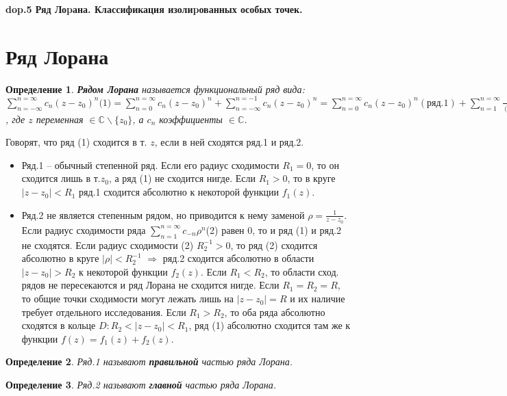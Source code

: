 \documentclass{article}
\newtheorem{definition}{Определение}
\begin{document}
\textbf{\LARGE dop.5 Ряд Лоpана. Классификация изолиpованных особых точек.}
\section{Ряд Лорана}
\begin{definition}
\textbf{Рядом Лорана} называется функциональный ряд вида: $\sum_{n=-\infty}^{n=\infty}c_n(z-z_0)^n\text{(1)}=\sum_{n=0}^{n=\infty}c_n(z-z_0)^n + \sum_{n=-\infty}^{n=-1}c_{n}(z-z_0)^n = \sum_{n=0}^{n=\infty}c_n(z-z_0)^n(\text{ряд.1}) +  \sum_{n=1}^{n=\infty}\frac{c_{-n}}{(z-z_0)^n}(\text{ряд.2})$, где $z$ переменная $\in \mathbb{C}\backslash\{z_0\}$, а $c_n$ коэффициенты $\in \mathbb{C}$.
\end{definition}

\noindent Говорят, что ряд (1) сходится в т. $z$, если в ней сходятся ряд.1 и ряд.2.

\begin{itemize}
    \item Ряд.1 -- обычный степенной ряд. Если его радиус сходимости $R_1=0$, то он сходится лишь в т.$z_0$, а ряд (1) не сходится нигде. Если $R_1>0$, то в круге $|z-z_0|<R_1$ ряд.1 сходится абсолютно к некоторой функции $f_1(z)$.
    
    \item Ряд.2 не является степенным рядом, но приводится к нему заменой $\rho = \frac{1}{z-z_0}$. Если радиус сходимости ряда $\sum_{n=1}^{n=\infty}c_{-n}\rho^n$(2) равен 0, то и ряд (1) и ряд.2 не сходятся. Если радиус сходимости (2) $R^{-1}_2 > 0$, то ряд (2) сходится абсолютно в круге $|\rho|<R^{-1}_2$ $\Rightarrow$ ряд.2 сходится абсолютно в области $|z-z_0|>R_2$  к некоторой функции $f_2(z)$. Если $R_1<R_2$, то области сход. рядов не пересекаются и ряд Лорана не сходится нигде. Если $R_1=R_2=R$, то общие точки сходимости могут лежать лишь на $|z-z_0|=R$ и их наличие требует отдельного исследования. Если $R_1>R_2$, то оба ряда абсолютно сходятся в кольце $D: R_2<|z-z_0|<R_1$, ряд (1) абсолютно сходится там же к функции $f(z) = f_1(z)+f_2(z)$.
\end{itemize}

\begin{definition}
Ряд.1 называют \textbf{правильной} частью ряда Лорана.
\end{definition}

\begin{definition}
Ряд.2 называют \textbf{главной} частью ряда Лорана.
\end{definition}
\end{document}
